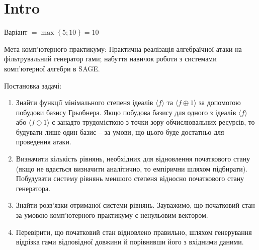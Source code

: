 \chapter{Intro}
\label{chap:1}
\begin{center}
    Варіант $ = \max \left\{5 ; 10\right\} = 10$
\end{center}
Мета комп'ютерного практикуму: Практична реалізація алгебраїчної атаки на фільтрувальний генератор гами; набуття
навичок роботи з системами комп’ютерної алгебри в SAGE.

\noindent Постановка задачі:
\begin{enumerate}
    \item Знайти функції мінімального степеня ідеалів $\langle f \rangle$ та $\langle f \oplus 1\rangle$ за допомогою побудови
        базису Грьобнера. Якщо побудова базису для одного з ідеалів $\langle f \rangle$ або $\langle f \oplus 1\rangle$ є занадто
        трудомісткою з точки зору обчислювальних ресурсів, то будувати лише один базис -- за умови, що цього буде достатньо для
        проведення атаки.
    \item Визначити кількість рівнянь, необхідних для відновлення початкового стану (якщо не вдається визначити аналітично,
        то емпірични шляхом підбирати). Побудувати систему рівнянь меншого степеня відносно початкового стану генератора.
    \item Знайти розв’язки отриманої системи рівнянь. Зауважимо, що початковий стан за умовою комп’ютерного практикуму
        є ненульовим вектором.
    \item Перевірити, що початковий стан відновлено правильно, шляхом генерування відрізка гами відповідної довжини й
        порівнявши його з вхідними даними.
\end{enumerate}

